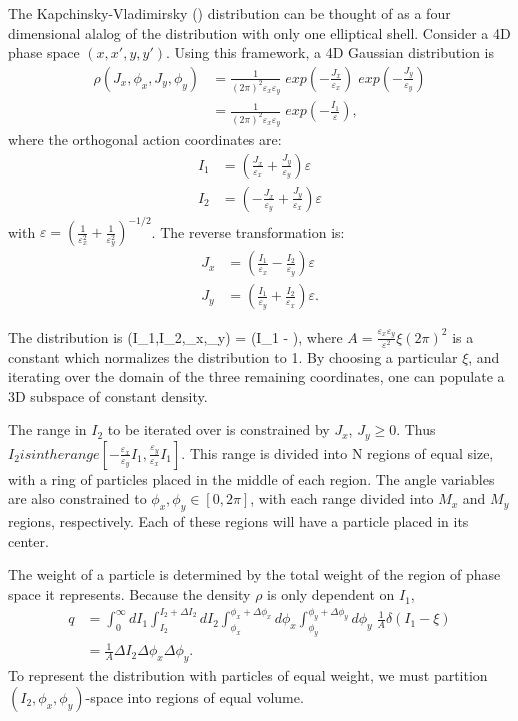 The Kapchinsky-Vladimirsky () distribution can be thought of as
a four dimensional alalog of the  distribution with only one
elliptical shell. Consider a 4D phase space $(x,x', y,y')$.  
Using this framework, a 4D Gaussian distribution is
\begin{align}
  \rho(J_x, \phi_x, J_y, \phi_y) &= 
    \frac{1}{(2\pi)^2 \varepsilon_x \varepsilon_y}\; 
    exp(-\frac{J_x}{\varepsilon_x})\; exp(-\frac{J_y} {\varepsilon_y}) \\
  &= \frac{1}{(2\pi)^2 \varepsilon_x \varepsilon_y}\; 
    exp(-\frac{I_1}{\varepsilon}) ,
\end{align}
where the orthogonal action coordinates are:
\begin{align}
  I_1 &= \left(  \frac{J_x}{\varepsilon_x} + \frac{J_y}{\varepsilon_y} \right) \varepsilon \\
  I_2 &= \left( -\frac{J_x}{\varepsilon_y} + \frac{J_y}{\varepsilon_x} \right) \varepsilon
\end{align}
with $\varepsilon = (\frac{1}{\varepsilon_x^2} + \frac{1}{\varepsilon_y^2})^{-1/2}$.  
The reverse transformation is:
\begin{align}
   J_x & = \left( \frac{I_1}{\varepsilon_x} - \frac{I_2}{\varepsilon_y} \right) 
      \varepsilon  \\
   J_y & = \left( \frac{I_1}{\varepsilon_y} + \frac{I_2}{\varepsilon_x} \right) 
      \varepsilon.
\end{align}

The  distribution is
\Begineq
  \rho(I_1,I_2,\phi_x,\phi_y) =  \delta(I_1 - \xi),
\Endeq
where $A = \frac{\varepsilon_x \varepsilon_y}{\varepsilon^2} \xi (2\pi)^2$ 
is a constant which normalizes the distribution to 1.  
By choosing a particular $\xi$, and iterating over the domain of the three remaining
coordinates, one can populate a 3D subspace of constant density.

The range in $I_2$ to be iterated over is constrained by $J_x$, $J_y \geq 0$.  
Thus $I_2 is in the range [-\frac{\varepsilon_x}{\varepsilon_y} I_1, 
\frac{\varepsilon_y}{\varepsilon_x} I_1]$. 
This range is divided into N regions of equal size, with a ring of 
particles placed in the middle of each region.  
The angle variables are also constrained to $\phi_x, \phi_y \in [0, 2\pi]$, 
with each range divided into $M_x$ and $M_y$ regions, respectively.  
Each of these regions will have a particle placed in its center.

The weight of a particle is determined by the total weight of the region 
of phase space it represents.  
Because the density $\rho$ is only dependent on $I_1$,
\begin{align}
   q &= \int_{0}^{\infty} dI_1 \int_{I_2}^{I_2 + \Delta I_2} 
     dI_2 \int_{\phi_x}^{\phi_x + \Delta \phi_x} d\phi_x 
    \int_{\phi_y}^{\phi_y + \Delta \phi_y} d\phi_y \; \frac{1}{A} \delta(I_1 - \xi) \\
   &= \frac{1}{A} \Delta I_2 \Delta \phi_x \Delta \phi_y.
\end{align}
To represent the distribution with particles of equal weight, 
we must partition $(I_2,\phi_x,\phi_y)$-space into regions of equal volume.

